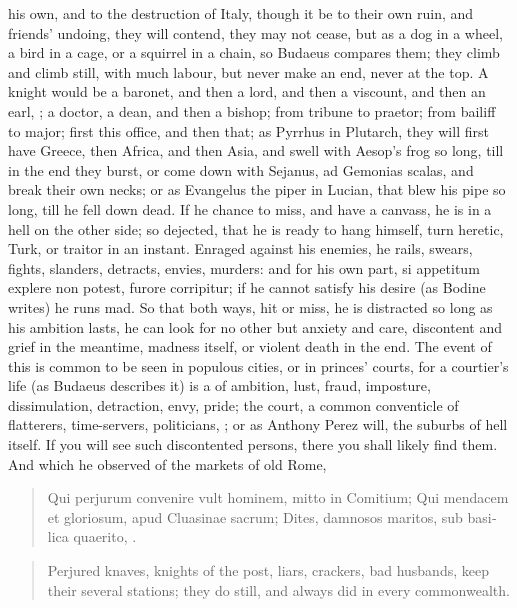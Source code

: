 {{his own, and to the destruction of Italy, though it be to their own
ruin, and friends' undoing, they will contend, they may not cease, but
as a dog in a wheel, a bird in a cage, or a squirrel in a chain, so
Budaeus compares them; they climb and climb still, with
much labour, but never make an end, never at the top. A knight would be
a baronet, and then a lord, and then a viscount, and then an earl, \etc{};
a doctor, a dean, and then a bishop; from tribune to praetor; from
bailiff to major; first this office, and then that; as Pyrrhus in
Plutarch, they will first have Greece, then Africa, and then
Asia, and swell with Aesop's frog so long, till in the end they burst,
or come down with Sejanus, ad Gemonias scalas, and break their own
necks; or as Evangelus the piper in Lucian, that blew his pipe so long,
till he fell down dead. If he chance to miss, and have a canvass, he is
in a hell on the other side; so dejected, that he is ready to hang
himself, turn heretic, Turk, or traitor in an instant. Enraged against
his enemies, he rails, swears, fights, slanders, detracts, envies,
murders: and for his own part, si appetitum explere non potest, furore
corripitur; if he cannot satisfy his desire (as Bodine writes) he
runs mad. So that both ways, hit or miss, he is distracted so long as
his ambition lasts, he can look for no other but anxiety and care,
discontent and grief in the meantime, madness itself, or violent
death in the end. The event of this is common to be seen in populous
cities, or in princes' courts, for a courtier's life (as Budaeus
describes it) is a  of ambition, lust, fraud,
imposture, dissimulation, detraction, envy, pride; the court, a
common conventicle of flatterers, time-servers, politicians, \etc{}; or as
 Anthony Perez will, the suburbs of hell itself. If you will see
such discontented persons, there you shall likely find them. And
which he observed of the markets of old Rome,
%
\begin{latin}
\begin{quote}
Qui perjurum convenire vult hominem, mitto in Comitium;
Qui mendacem et gloriosum, apud Cluasinae sacrum;
Dites, damnosos maritos, sub basilica quaerito, \etc{}.
\end{quote}
\end{latin}
\translationrule
\begin{quote}
Perjured knaves, knights of the post, liars, crackers, bad husbands,
\etc{} keep their several stations; they do still, and always did in every
commonwealth.
\end{quote}

}}
